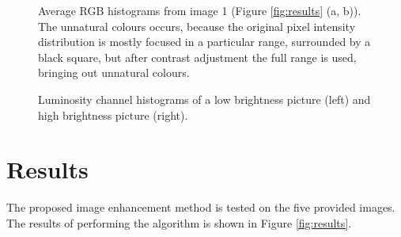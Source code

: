 \documentclass[journal,transmag]{IEEEtran}
\begin{document}
\begin{figure}[b]
	\centering
\caption{Average RGB histograms from image 1 (Figure \ref{fig:results} (a, b)).  The unnatural colours occurs, because the original pixel intensity distribution is mostly focused in a particular range, surrounded by a black square, but after contrast adjustment the full range is used, bringing out unnatural colours.}
\label{fig:image01_hists}
\end{figure}

\begin{figure}[b]
	\centering
	\caption{Luminosity channel histograms of a low brightness picture (left) and high brightness picture (right).}
	\label{fig:luminDiffHist}
\end{figure}

\section{Results}
\label{sec:results}
The proposed image enhancement method is tested on the five provided images. The results of performing the algorithm is shown in Figure \ref{fig:results}.
\end{document}
